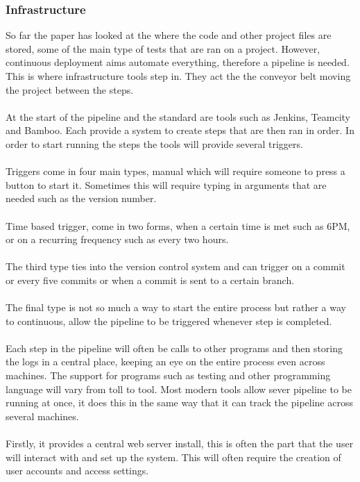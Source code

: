 \subsubsection{Infrastructure}

So far the paper has looked at the where the code and other project files are stored, some of the main type of tests that are ran on a project. However, continuous deployment aims automate everything, therefore a pipeline is needed. This is where infrastructure tools step in. They act the the conveyor belt moving the project between the steps.
\\\\
At the start of the pipeline and the standard are tools such as Jenkins, Teamcity and Bamboo. Each provide a system to create steps that are then ran in order. In order to start running the steps the tools will provide several triggers.
\\\\
Triggers come in four main types, manual which will require someone to press a button to start it. Sometimes this will require typing in arguments that are needed such as the version number. 
\\\\
Time based trigger, come in two forms, when a certain time is met such as 6PM, or on a recurring frequency such as every two hours.
\\\\
The third type ties into the version control system and can trigger on a commit or every five commits or when a commit is sent to a certain branch. 
\\\\
The final type is not so much a way to start the entire process but rather a way to continuous, allow the pipeline to be triggered whenever step is completed.
\\\\
Each step in the pipeline will often be calls to other programs and then storing the logs in a central place, keeping an eye on the entire process even across machines. The support for programs such as testing and other programming language will vary from toll  to tool. Most modern tools allow sever pipeline to be running at once, it does this in the same way that  it can track the pipeline across several machines. 
\\\\
Firstly, it provides a central web server install, this is often the part that the user will interact with and set up the system. This will often require the creation of user accounts and access settings.
